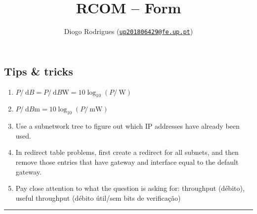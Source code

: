\documentclass{form}
\author{Diogo Rodrigues (\texttt{\href{mailto:up201806429@fe.up.pt}{up201806429@fe.up.pt}})}
\title{RCOM -- Form}
\begin{document}
    

\begin{multicols}{2}
    \section*{Tips \& tricks}
    \begin{enumerate}
        \setlength\itemsep{0em}
        \item $P/\SI{}{\deci B} = P/\SI{}{\deci B \watt} = 10 \log_{10}{(P/\SI{}{\watt})}$
        \item $P/\SI{}{\deci B \milli} = 10 \log_{10}{(P/\SI{}{\milli\watt})}$
        \item Use a subnetwork tree to figure out which IP addresses have already been used.
        \item In redirect table problems, first create a redirect for all subnets, and then remove those entries that have gateway and interface equal to the default gateway.
        \item Pay close attention to what the question is asking for: throughput (débito), useful throughput (débito útil/sem bits de verificação)
    \end{enumerate}
\end{multicols}

\vspace{-1.5em}\noindent\rule{\textwidth}{1.0pt}\vspace{-0em}
\end{document}
